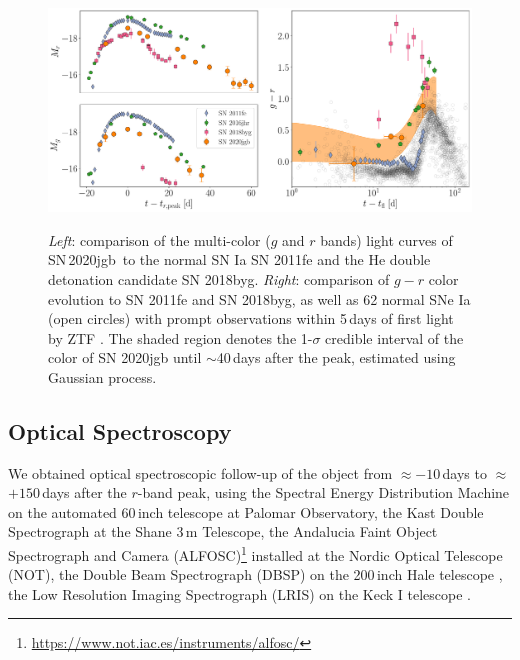 \documentclass[twocolumn]{aastex631}
\newcommand\sn{SN\,2020jgb}
\begin{document}
\begin{figure}
    \centering
    \includegraphics[width=\textwidth]{photometry.pdf}
    \label{fig:photometry}
    \caption{\textit{Left}: comparison of the multi-color ($g$ and $r$ bands) light curves of \sn\ to the normal SN Ia SN 2011fe and the He double detonation candidate SN 2018byg. \textit{Right}: comparison of $g-r$ color evolution to SN 2011fe and SN 2018byg, as well as 62 normal SNe Ia (open circles) with prompt observations within 5\,days of first light by ZTF \citep{Bulla2020}. The shaded region denotes the 1-$\sigma$ credible interval of the color of SN 2020jgb until $\sim$40\,days after the peak, estimated using Gaussian process.}
\end{figure}

\subsection{Optical Spectroscopy}
We obtained optical spectroscopic follow-up of the object from $\approx$$-10$\,days to $\approx$$+150$\,days after the $r$-band peak, using the Spectral Energy Distribution Machine \citep[SEDM;][]{SEDM_2018} on the automated 60\,inch telescope \citep[P60;][]{P60_2006} at Palomar Observatory, the Kast Double Spectrograph \citep{miller1994kast} at the Shane 3\,m Telescope, the Andalucia Faint Object Spectrograph and Camera (ALFOSC)\footnote{\url{https://www.not.iac.es/instruments/alfosc/}} installed at the Nordic Optical Telescope (NOT), the Double Beam Spectrograph (DBSP) on the 200\,inch Hale telescope \citep[P200;][]{P200_1982}, the Low Resolution Imaging Spectrograph (LRIS) on the Keck I telescope \citep{Keck_1995}.
\end{document}
